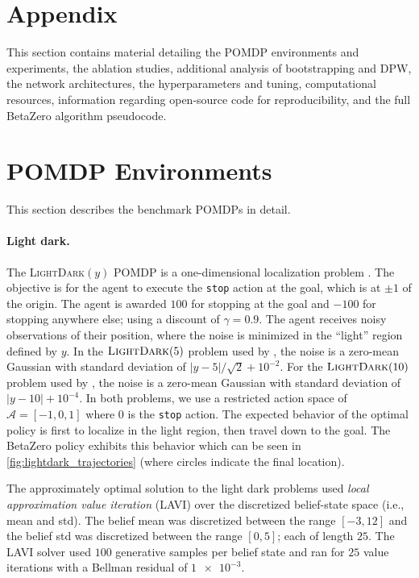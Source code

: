 

\appendix

\section*{Appendix}

This section contains material detailing the POMDP environments and experiments, the ablation studies, additional analysis of bootstrapping and DPW, the network architectures, the hyperparameters and tuning, computational resources, information regarding open-source code for reproducibility, and the full BetaZero algorithm pseudocode.

\section*{POMDP Environments}
This section describes the benchmark POMDPs in detail.

\paragraph{Light dark.}

The \textsc{LightDark}$(y)$ POMDP is a one-dimensional localization problem \cite{platt2010belief}.
The objective is for the agent to execute the \texttt{stop} action at the goal, which is at $\pm 1$ of the origin.
The agent is awarded $100$ for stopping at the goal and $-100$ for stopping anywhere else; using a discount of $\gamma = 0.9$.
The agent receives noisy observations of their position, where the noise is minimized in the ``light'' region defined by $y$.
In the $\textsc{LightDark}(5)$ problem used by \citeauthor{wu2021adaptive}, the noise is a zero-mean Gaussian with standard deviation of $|y - 5|/\sqrt{2} + 10^{-2}$.
For the $\textsc{LightDark}(10)$ problem used by \citeauthor{sunberg2018online}, the noise is a zero-mean Gaussian with standard deviation of $|y - 10| + 10^{-4}$.
In both problems, we use a restricted action space of $\mathcal{A} = [-1, 0, 1]$ where $0$ is the \texttt{stop} action.
The expected behavior of the optimal policy is first to localize in the light region, then travel down to the goal.
The BetaZero policy exhibits this behavior which can be seen in \cref{fig:lightdark_trajectories} (where circles indicate the final location).


The approximately optimal solution to the light dark problems used \textit{local approximation value iteration} (LAVI) \cite{dmubook} over the discretized belief-state space (i.e., mean and std).
The belief mean was discretized between the range $[-3, 12]$ and the belief std was discretized between the range $[0, 5]$; each of length $25$.
The LAVI solver used $100$ generative samples per belief state and ran for $25$ value iterations with a Bellman residual of $\num{1e-3}$.


